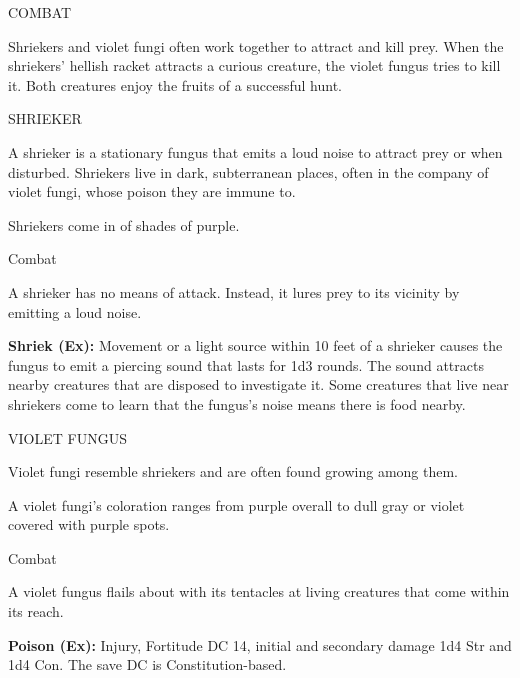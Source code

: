 \documentclass{article}
\begin{document}
COMBAT

Shriekers and violet fungi often work together to attract and kill prey. When the 
shriekers' hellish racket attracts a curious creature, the violet fungus tries 
to kill it. Both creatures enjoy the fruits of a successful hunt.

SHRIEKER

A shrieker is a stationary fungus that emits a loud noise to attract prey or when 
disturbed. Shriekers live in dark, subterranean places, often in the company of 
violet fungi, whose poison they are immune to.

Shriekers come in of shades of purple.

Combat

A shrieker has no means of attack. Instead, it lures prey to its vicinity by emitting 
a loud noise.

\textbf{Shriek (Ex):} Movement or a light source within 10 feet of a shrieker causes 
the fungus to emit a piercing sound that lasts for 1d3 rounds. The sound attracts 
nearby creatures that are disposed to investigate it. Some creatures that live 
near shriekers come to learn that the fungus's noise means there is food nearby.

VIOLET FUNGUS

Violet fungi resemble shriekers and are often found growing among them.

A violet fungi's coloration ranges from purple overall to dull gray or violet covered 
with purple spots.

Combat

A violet fungus flails about with its tentacles at living creatures that come within 
its reach.

\textbf{Poison (Ex):} Injury, Fortitude DC 14, initial and secondary damage 1d4 
Str and 1d4 Con. The save DC is Constitution-based.

\newpage
\end{document}
